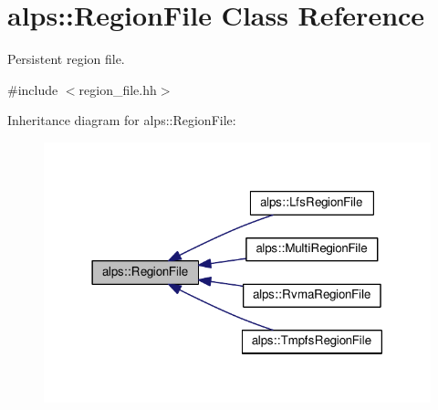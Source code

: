 \hypertarget{classalps_1_1RegionFile}{}\section{alps\+:\+:Region\+File Class Reference}
\label{classalps_1_1RegionFile}


Persistent region file.  




{\ttfamily \#include $<$region\+\_\+file.\+hh$>$}



Inheritance diagram for alps\+:\+:Region\+File\+:
\nopagebreak
\begin{figure}[H]
\begin{center}
\leavevmode
\includegraphics[width=318pt]{classalps_1_1RegionFile__inherit__graph}
\end{center}
\end{figure}
